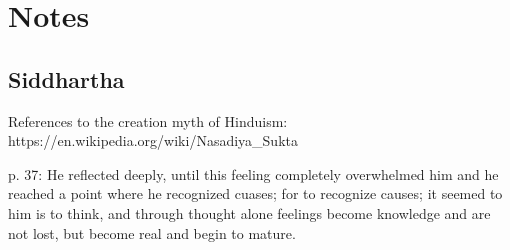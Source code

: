 
\chapter{Notes}

\section{Siddhartha}

References to the creation myth of Hinduism:
https://en.wikipedia.org/wiki/Nasadiya_Sukta

p. 37: He reflected deeply, until this feeling completely overwhelmed him and he
reached a point where he recognized cuases; for to recognize causes; it seemed
to him is to think, and through thought alone feelings become knowledge and are
not lost, but become real and begin to mature.

